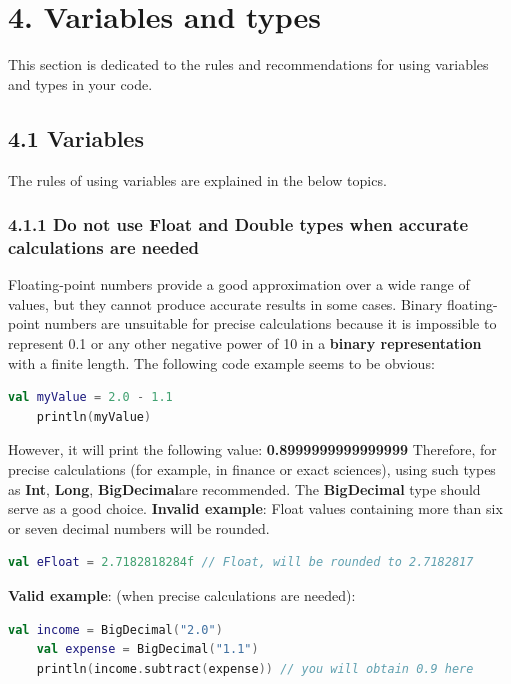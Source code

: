 \section*{\textbf{4. Variables and types}}
\label{sec:4.}
This section is dedicated to the rules and recommendations for using variables and types in your code.
\subsection*{\textbf{4.1 Variables}}
\label{sec:4.1}
The rules of using variables are explained in the below topics.
\subsubsection*{\textbf{4.1.1 Do not use Float and Double types when accurate calculations are needed}}
\leavevmode\newline
\label{sec:4.1.1}
Floating-point numbers provide a good approximation over a wide range of values, but they cannot produce accurate results in some cases.
Binary floating-point numbers are unsuitable for precise calculations because it is impossible to represent 0.1 or any other negative power of 10 in a \textbf{binary representation} with a finite length.
The following code example seems to be obvious:
\begin{lstlisting}[language=Kotlin]
    val myValue = 2.0 - 1.1
    println(myValue)
\end{lstlisting}
However, it will print the following value: \textbf{0.8999999999999999}
Therefore, for precise calculations (for example, in finance or exact sciences), using such types as \textbf{Int}, \textbf{Long}, \textbf{BigDecimal}are recommended.
The \textbf{BigDecimal} type should serve as a good choice.
\textbf{Invalid example}:
Float values containing more than six or seven decimal numbers will be rounded.
\begin{lstlisting}[language=Kotlin]
 val eFloat = 2.7182818284f // Float, will be rounded to 2.7182817
\end{lstlisting}
\textbf{Valid example}: (when precise calculations are needed):
\begin{lstlisting}[language=Kotlin]
    val income = BigDecimal("2.0")
    val expense = BigDecimal("1.1")
    println(income.subtract(expense)) // you will obtain 0.9 here
\end{lstlisting}
